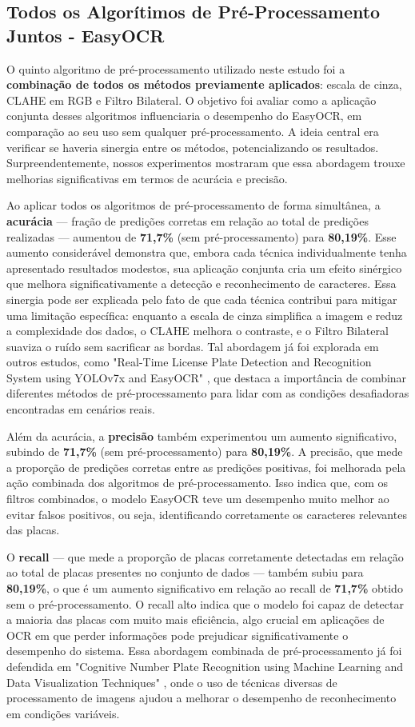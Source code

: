 \documentclass[conference]{IEEEtran}
\begin{document}
\subsection{Todos os Algorítimos de Pré-Processamento Juntos - EasyOCR}

O quinto algoritmo de pré-processamento utilizado neste estudo foi a \textbf{combinação de todos os métodos previamente aplicados}: escala de cinza, CLAHE em RGB e Filtro Bilateral. O objetivo foi avaliar como a aplicação conjunta desses algoritmos influenciaria o desempenho do EasyOCR, em comparação ao seu uso sem qualquer pré-processamento. A ideia central era verificar se haveria sinergia entre os métodos, potencializando os resultados. Surpreendentemente, nossos experimentos mostraram que essa abordagem trouxe melhorias significativas em termos de acurácia e precisão.

Ao aplicar todos os algoritmos de pré-processamento de forma simultânea, a \textbf{acurácia} — fração de predições corretas em relação ao total de predições realizadas — aumentou de \textbf{71,7\%} (sem pré-processamento) para \textbf{80,19\%}. Esse aumento considerável demonstra que, embora cada técnica individualmente tenha apresentado resultados modestos, sua aplicação conjunta cria um efeito sinérgico que melhora significativamente a detecção e reconhecimento de caracteres. Essa sinergia pode ser explicada pelo fato de que cada técnica contribui para mitigar uma limitação específica: enquanto a escala de cinza simplifica a imagem e reduz a complexidade dos dados, o CLAHE melhora o contraste, e o Filtro Bilateral suaviza o ruído sem sacrificar as bordas. Tal abordagem já foi explorada em outros estudos, como "Real-Time License Plate Detection and Recognition System using YOLOv7x and EasyOCR" \cite{b2}, que destaca a importância de combinar diferentes métodos de pré-processamento para lidar com as condições desafiadoras encontradas em cenários reais.

Além da acurácia, a \textbf{precisão} também experimentou um aumento significativo, subindo de \textbf{71,7\%} (sem pré-processamento) para \textbf{80,19\%}. A precisão, que mede a proporção de predições corretas entre as predições positivas, foi melhorada pela ação combinada dos algoritmos de pré-processamento. Isso indica que, com os filtros combinados, o modelo EasyOCR teve um desempenho muito melhor ao evitar falsos positivos, ou seja, identificando corretamente os caracteres relevantes das placas.

O \textbf{recall} — que mede a proporção de placas corretamente detectadas em relação ao total de placas presentes no conjunto de dados — também subiu para \textbf{80,19\%}, o que é um aumento significativo em relação ao recall de \textbf{71,7\%} obtido sem o pré-processamento. O recall alto indica que o modelo foi capaz de detectar a maioria das placas com muito mais eficiência, algo crucial em aplicações de OCR em que perder informações pode prejudicar significativamente o desempenho do sistema. Essa abordagem combinada de pré-processamento já foi defendida em "Cognitive Number Plate Recognition using Machine Learning and Data Visualization Techniques" \cite{b6}, onde o uso de técnicas diversas de processamento de imagens ajudou a melhorar o desempenho de reconhecimento em condições variáveis.
\end{document}
